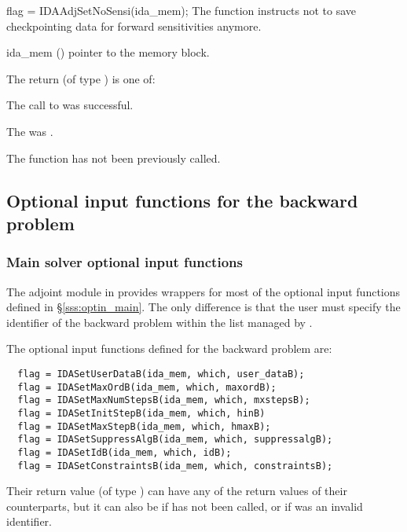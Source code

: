 {
  flag = IDAAdjSetNoSensi(ida\_mem);
}
{
  The function  instructs  not
  to save checkpointing data for forward sensitivities anymore.
}
{
  \begin{args}
  \item[ida\_mem] ()
    pointer to the {\idas}  memory block.
  \end{args}
}
{
  The return  (of type ) is one of:
  \begin{args}
  \item[\Id{IDA\_SUCCESS}]
    The call to  was successful.
  \item[\Id{IDA\_MEM\_NULL}]
    The  was .
  \item[\Id{IDA\_NO\_ADJ}]
    The function  has not been previously called.
  \end{args}
}
{}


\subsection{Optional input functions for the backward problem}
\label{ss:optional_input_b}
\subsubsection{Main solver optional input functions}

The adjoint module in {\idas} provides wrappers for most of the optional 
input functions defined in \S\ref{sss:optin_main}. The only difference is 
that the user must specify the identifier  of the backward problem 
within the list managed by {\idas}. 

The optional input functions defined for the backward problem are:
\begin{verbatim}
  flag = IDASetUserDataB(ida_mem, which, user_dataB);
  flag = IDASetMaxOrdB(ida_mem, which, maxordB);
  flag = IDASetMaxNumStepsB(ida_mem, which, mxstepsB);
  flag = IDASetInitStepB(ida_mem, which, hinB)
  flag = IDASetMaxStepB(ida_mem, which, hmaxB);
  flag = IDASetSuppressAlgB(ida_mem, which, suppressalgB);
  flag = IDASetIdB(ida_mem, which, idB);
  flag = IDASetConstraintsB(ida_mem, which, constraintsB);
\end{verbatim}
Their return value  (of type ) can have any of the return values 
of their counterparts, but it can also be  if  
has not been called, or  if  was an invalid identifier. 

